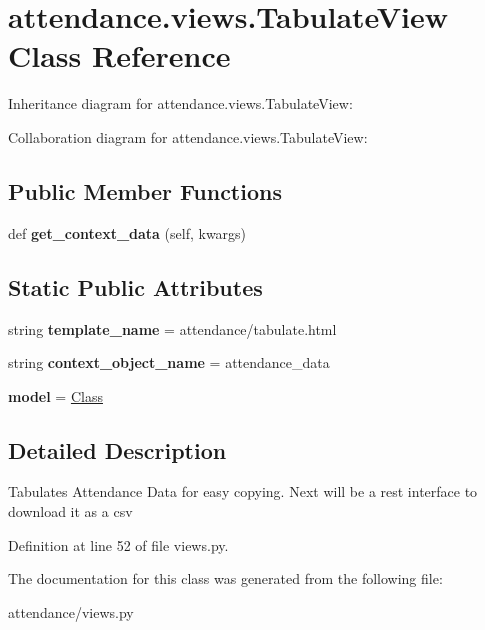 \hypertarget{classattendance_1_1views_1_1_tabulate_view}{}\section{attendance.\+views.\+Tabulate\+View Class Reference}
\label{classattendance_1_1views_1_1_tabulate_view}


Inheritance diagram for attendance.\+views.\+Tabulate\+View\+:


Collaboration diagram for attendance.\+views.\+Tabulate\+View\+:
\subsection*{Public Member Functions}
\begin{DoxyCompactItemize}
\item 
\hypertarget{classattendance_1_1views_1_1_tabulate_view_a13ac76bce5eefef9d6e971efdbbda4c8}{}\label{classattendance_1_1views_1_1_tabulate_view_a13ac76bce5eefef9d6e971efdbbda4c8} 
def {\bfseries get\+\_\+context\+\_\+data} (self, kwargs)
\end{DoxyCompactItemize}
\subsection*{Static Public Attributes}
\begin{DoxyCompactItemize}
\item 
\hypertarget{classattendance_1_1views_1_1_tabulate_view_add01593cdeec23cfc79e5143f3995c84}{}\label{classattendance_1_1views_1_1_tabulate_view_add01593cdeec23cfc79e5143f3995c84} 
string {\bfseries template\+\_\+name} = \textquotesingle{}attendance/tabulate.\+html\textquotesingle{}
\item 
\hypertarget{classattendance_1_1views_1_1_tabulate_view_ab64bcc62a7381e1dc3736f4202c50cd1}{}\label{classattendance_1_1views_1_1_tabulate_view_ab64bcc62a7381e1dc3736f4202c50cd1} 
string {\bfseries context\+\_\+object\+\_\+name} = \textquotesingle{}attendance\+\_\+data\textquotesingle{}
\item 
\hypertarget{classattendance_1_1views_1_1_tabulate_view_afe1444ffe08091e734d55dc76d4234ba}{}\label{classattendance_1_1views_1_1_tabulate_view_afe1444ffe08091e734d55dc76d4234ba} 
{\bfseries model} = \hyperlink{classattendance_1_1models_1_1_class}{Class}
\end{DoxyCompactItemize}


\subsection{Detailed Description}
\begin{DoxyVerb}Tabulates Attendance Data for easy copying.  Next will be a rest interface to download it as a csv
\end{DoxyVerb}
 

Definition at line 52 of file views.\+py.



The documentation for this class was generated from the following file\+:\begin{DoxyCompactItemize}
\item 
attendance/views.\+py\end{DoxyCompactItemize}
